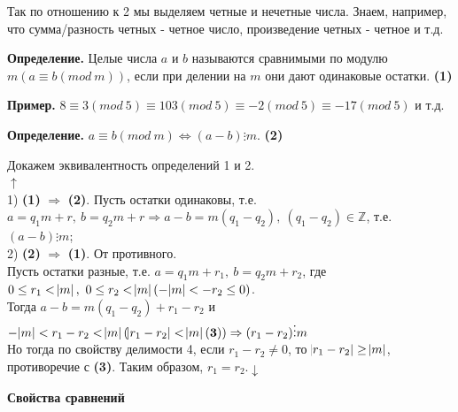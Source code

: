 \documentclass{article}
\begin{document}
            Так по отношению к 2 мы выделяем четные и нечетные числа. Знаем, например, что сумма/разность четных - четное число, произведение четных - четное и т.д.

            \textbf{Определение.} Целые числа \( a \) и \( b \) называются сравнимыми по модулю \( m (a \equiv b (mod\ m)) \), если при делении на \( m \) они дают одинаковые остатки. \textbf{(1)}

            \textbf{Пример.} \( 8 \equiv 3 (mod\ 5) \equiv 103 (mod\ 5) \equiv -2 (mod\ 5) \equiv -17 (mod\ 5) \) и т.д.

            \textbf{Определение.} \( a \equiv b (mod\ m) \Leftrightarrow (a - b) \vdots m \). \textbf{(2)}

            Докажем эквивалентность определений 1 и 2.\\
            \( \uparrow \)\\
            1) \textbf{(1)} \( \Rightarrow \) \textbf{(2)}. Пусть остатки одинаковы, т.е. \( a = q_1m + r,\ b = q_2m + r \Rightarrow a - b = m(q_1 - q_2),\ (q_1 - q_2) \in \mathbb{Z} \), т.е. \( (a - b) \vdots m \);\\
            2) \textbf{(2)} \( \Rightarrow \) \textbf{(1)}. От противного.\\
            Пусть остатки разные, т.е. \( a = q_1m + r_1,\ b = q_2m + r_2 \), где \( 0 \leq r_1 < \abs{m},\ 0 \leq r_2 < \abs{m} (-\abs{m} < -r_2 \leq 0) \).\\
            Тогда \( a - b = m(q_1 - q_2) + r_1 - r_2 \) и \( -\abs{m} < r_1 - r_2 < \abs{m} (\abs{r_1 - r_2} < \abs{m} \mathbf{(3)}) \Rightarrow (r_1 - r_2) \vdots m \)\\
            Но тогда по свойству делимости 4, если \( r_1 - r_2 \neq 0 \), то \( \abs{r_1 - r_2} \geq \abs{m} \), противоречие с \textbf{(3)}. Таким образом, \(r_1 = r_2. \downarrow \)

            \textbf{Свойства сравнений}
            
\end{document}
